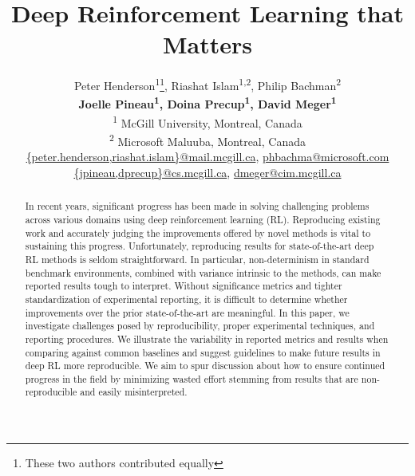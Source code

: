 \documentclass[letterpaper]{article} %
\newcommand*\samethanks[1][\value{footnote}]{\footnotemark[#1]}
\begin{document}


\title{Deep Reinforcement Learning that Matters}
\author{
Peter Henderson\textsuperscript{1}\thanks{These two authors contributed equally},
Riashat Islam\textsuperscript{1,2}\samethanks,
Philip Bachman\textsuperscript{2}\\
\Large{\bf{Joelle Pineau\textsuperscript{1},
Doina Precup\textsuperscript{1},
David Meger\textsuperscript{1}}}\\
\textsuperscript{1} McGill University, Montreal, Canada\\
\textsuperscript{2} Microsoft Maluuba, Montreal, Canada\\
\url{{peter.henderson,riashat.islam}@mail.mcgill.ca}, \url{phbachma@microsoft.com}\\
\url{{jpineau,dprecup}@cs.mcgill.ca}, \url{dmeger@cim.mcgill.ca}
}


\maketitle


\begin{abstract}
In recent years, significant progress has been made in solving challenging problems across various domains using deep reinforcement learning (RL). Reproducing existing work and accurately judging the improvements offered by novel methods is vital to sustaining this progress. Unfortunately, reproducing results for state-of-the-art deep RL methods is seldom straightforward. In particular, non-determinism in standard benchmark environments, combined with variance intrinsic to the methods, can make reported results tough to interpret. Without significance metrics and tighter standardization of experimental reporting, it is difficult to determine whether improvements over the prior state-of-the-art are meaningful. In this paper, we investigate challenges posed by reproducibility, proper experimental techniques, and reporting procedures. We illustrate the variability in reported metrics and results when comparing against common baselines and suggest guidelines to make future results in deep RL more reproducible. We aim to spur discussion about how to ensure continued progress in the field by minimizing wasted effort stemming from results that are non-reproducible and easily misinterpreted.
\end{abstract}
\end{document}
